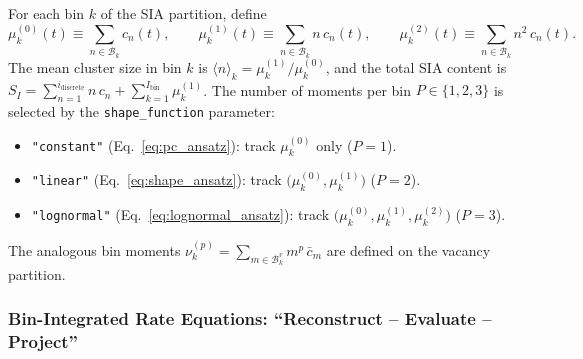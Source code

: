 For each bin $k$ of the SIA partition, define
\begin{equation}\label{eq:bin_moments_def}
    \mu_k^{(0)}(t) \equiv \sum_{n \in \mathcal{B}_k} c_n(t),
    \qquad
    \mu_k^{(1)}(t) \equiv \sum_{n \in \mathcal{B}_k} n\,c_n(t),
    \qquad
    \mu_k^{(2)}(t) \equiv \sum_{n \in \mathcal{B}_k} n^2\,c_n(t).
\end{equation}
The mean cluster size in bin $k$ is
$\langle n\rangle_k = \mu_k^{(1)}/\mu_k^{(0)}$, and the total SIA
content is
$S_I = \sum_{n=1}^{i_{\mathrm{discrete}}} n\,c_n
       + \sum_{k=1}^{I_{\mathrm{bin}}} \mu_k^{(1)}$.
The number of moments per bin $P \in \{1,2,3\}$ is selected by the
\texttt{shape\_function} parameter:
\begin{itemize}
  \item \texttt{"constant"} (Eq.~\ref{eq:pc_ansatz}): track
        $\mu_k^{(0)}$ only ($P=1$).
  \item \texttt{"linear"} (Eq.~\ref{eq:shape_ansatz}): track
        $\bigl(\mu_k^{(0)}, \mu_k^{(1)}\bigr)$ ($P=2$).
  \item \texttt{"lognormal"} (Eq.~\ref{eq:lognormal_ansatz}): track
        $\bigl(\mu_k^{(0)}, \mu_k^{(1)}, \mu_k^{(2)}\bigr)$ ($P=3$).
\end{itemize}
The analogous bin moments
$\nu_k^{(p)} = \sum_{m \in \mathcal{B}^v_k} m^p\,\bar{c}_m$
are defined on the vacancy partition.

\subsubsection*{Bin-Integrated Rate Equations: ``Reconstruct -- Evaluate -- Project''}
\label{sec:bin_rate_eq}


